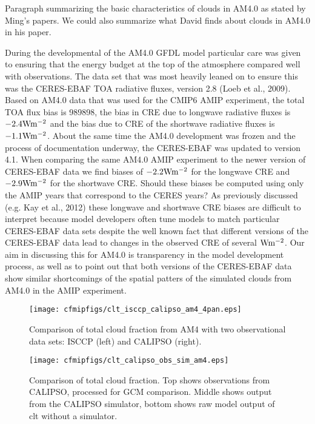 \documentclass[11pt]{article}   	%
\begin{document}
Paragraph summarizing the basic characteristics of clouds in AM4.0 as stated by Ming's papers.  We could also summarize 
what David finds about clouds in AM4.0 in his paper.

During the developmental of the AM4.0 GFDL model particular care was given to ensuring that the energy budget at 
the top of the atmosphere compared well with observations.  The data set that was most heavily leaned on to ensure 
this was the CERES-EBAF TOA radiative fluxes, version 2.8 (Loeb et al., 2009).  Based on AM4.0 data that was used for 
the CMIP6 AMIP
experiment, the total TOA flux bias is 989898, the bias in CRE 
due to longwave radiative fluxes is $-2.4 \rm{W m^{-2}} $ and the bias due to CRE of the shortwave radiative fluxes   
is $-1.1 \rm{W m^{-2}} $.  About the same time the AM4.0 development was frozen and the process of documentation 
underway, the CERES-EBAF was updated to version 4.1.  When comparing the same AM4.0 AMIP experiment to the 
newer version of CERES-EBAF data we find biases of $-2.2 \rm{W m^{-2}} $ for the longwave CRE and 
$-2.9 \rm{W m^{-2}} $ for the shortwave CRE.   Should these biases be computed using only the AMIP years that 
correspond to the CERES years?   As previously discussed (e.g. Kay et al., 2012) these longwave and shortwave CRE 
biases are difficult to interpret because model developers often tune models to match particular CERES-EBAF data 
sets despite the well known fact that different versions of the CERES-EBAF data lead to changes in the observed CRE of
several $\rm{W m^{-2}}$.   Our aim in discussing this for AM4.0 is transparency in the model development process, as 
well as to point out that both versions of the CERES-EBAF data show similar shortcomings of the spatial patters of the 
simulated clouds  from AM4.0 in the AMIP experiment.   



\begin{figure}
  \texttt{[image: cfmipfigs/clt\_isccp\_calipso\_am4\_4pan.eps]}
  \caption{Comparison of total cloud fraction from AM4 with two observational data sets: ISCCP (left) and CALIPSO (right).}
  \label{fig:clt_isccp_calipso}
\end{figure}

\begin{figure}
  \texttt{[image: cfmipfigs/clt\_calipso\_obs\_sim\_am4.eps]}
  \caption{Comparison of total cloud fraction.  Top shows observations from CALIPSO, processed for GCM comparison.  Middle 
  shows output from the CALIPSO simulator, bottom shows raw model output of clt without a simulator.}
  \label{fig:calipso_sim_vs_mod}
\end{figure}
\end{document}
